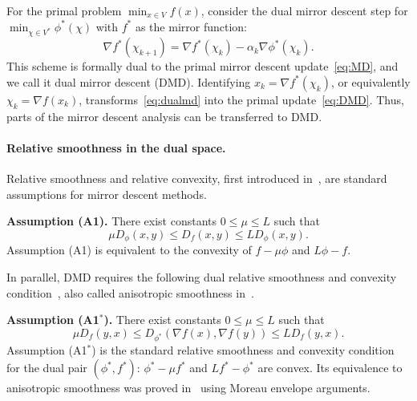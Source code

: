 \documentclass{article}
\theoremstyle{plain}
\theoremstyle{definition}
\theoremstyle{remark}
\begin{document}
For the primal problem $\min_{x\in V} f(x)$, consider the dual mirror descent step for $\min_{\chi\in V^*}\phi^*(\chi)$ with $f^*$ as the mirror function:
\begin{equation}\label{eq:dualmd}
\nabla f^*(\chi_{k+1})=\nabla f^*(\chi_k)-\alpha_k\nabla\phi^*(\chi_k).
\end{equation}
This scheme is formally dual to the primal mirror descent update~\eqref{eq:MD}, and we call it dual mirror descent (DMD). Identifying $x_k=\nabla f^*(\chi_k)$, or equivalently $\chi_k=\nabla f(x_k)$, transforms~\eqref{eq:dualmd} into the primal update~\eqref{eq:DMD}. 
Thus, parts of the mirror descent analysis can be transferred to DMD. 

\paragraph{Relative smoothness in the dual space.}
Relative smoothness and relative convexity, first introduced in~\cite{lu2018relatively}, are standard assumptions for mirror descent methods.

\noindent\textbf{Assumption (A1).} There exist constants $0\le \mu\le L$ such that
\begin{equation}\label{eq:relativesmoothness}
\mu D_\phi(x,y)\le D_f(x,y)\le L D_\phi(x,y).
\end{equation}
Assumption (A1) is equivalent to the convexity of $f-\mu\phi$ and $L\phi-f$.

In parallel, DMD requires the following dual relative smoothness and convexity condition~\cite{maddison2021dual}, also called anisotropic smoothness in~\cite{laude2025anisotropic}.

\noindent\textbf{Assumption (A1$^*$).} There exist constants $0\le \mu\le L$ such that
\begin{equation}\label{eq:Lmu-star-primal}
\mu D_f(y,x)\le D_{\phi^*}(\nabla f(x),\nabla f(y))\le L D_f(y,x).
\end{equation}
Assumption (A1$^*$) is the standard relative smoothness and convexity condition for the dual pair $(\phi^*,f^*)$: $\phi^*-\mu f^*$ and $Lf^*-\phi^*$ are convex. Its equivalence to anisotropic smoothness was proved in~\cite{laude2025anisotropic} using Moreau envelope arguments.
\end{document}
